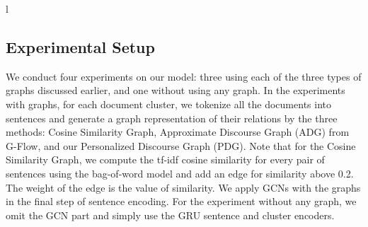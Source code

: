 \documentclass[11pt,a4paper]{article}
\begin{document}
\begin{table}[]
\begin{tabular}{l}
\begin{table}[t]
\centering
\hspace{-1mm}
\caption{Statistics for DUC Multi-Document Summarization Data Sets.}
\label{table:duc_dataset}
\vspace{-5mm}
\end{table}

\subsection{Experimental Setup}
We conduct four experiments on our model: three using each of the three types of graphs discussed earlier, and one without using any graph. 
In the experiments with graphs, for each document cluster, we tokenize all the documents into sentences and 
generate a graph representation of their relations by the three methods: Cosine Similarity Graph, Approximate Discourse Graph (ADG) from G-Flow, and our Personalized Discourse Graph (PDG). 
Note that for the Cosine Similarity Graph, we compute the tf-idf cosine similarity for every pair of sentences using the bag-of-word model and add an edge for similarity above 0.2. The weight of the edge is the value of similarity.
We apply GCNs with the graphs in the final step of sentence encoding.
For the experiment without any graph, we omit the GCN part and simply use the GRU sentence and cluster encoders.


\end{tabular}
\end{table}
\end{document}
